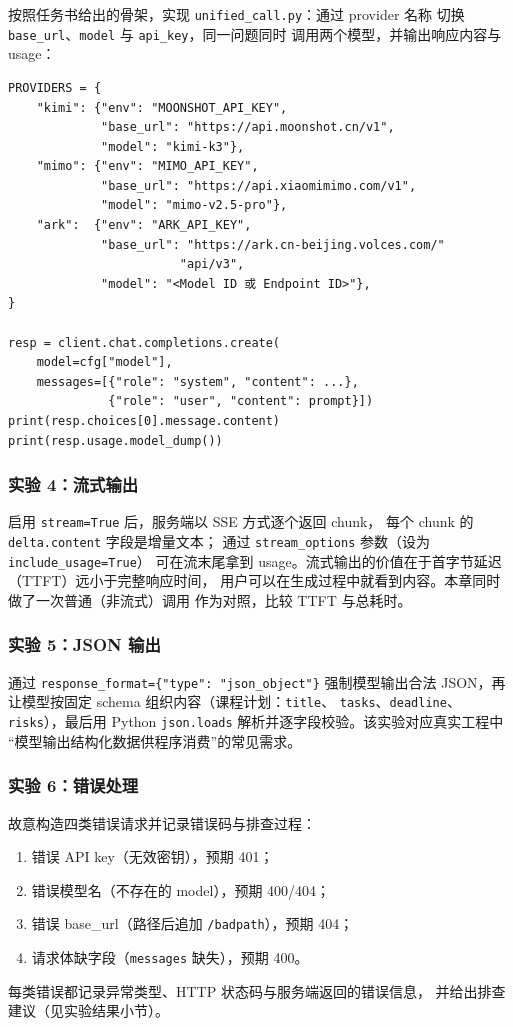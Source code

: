 按照任务书给出的骨架，实现 \texttt{unified\_call.py}：通过 provider 名称
切换 \texttt{base\_url}、\texttt{model} 与 \texttt{api\_key}，同一问题同时
调用两个模型，并输出响应内容与 usage：

\begin{verbatim}
PROVIDERS = {
    "kimi": {"env": "MOONSHOT_API_KEY",
             "base_url": "https://api.moonshot.cn/v1",
             "model": "kimi-k3"},
    "mimo": {"env": "MIMO_API_KEY",
             "base_url": "https://api.xiaomimimo.com/v1",
             "model": "mimo-v2.5-pro"},
    "ark":  {"env": "ARK_API_KEY",
             "base_url": "https://ark.cn-beijing.volces.com/"
                        "api/v3",
             "model": "<Model ID 或 Endpoint ID>"},
}

resp = client.chat.completions.create(
    model=cfg["model"],
    messages=[{"role": "system", "content": ...},
              {"role": "user", "content": prompt}])
print(resp.choices[0].message.content)
print(resp.usage.model_dump())
\end{verbatim}

\subsubsection{实验 4：流式输出}

启用 \texttt{stream=True} 后，服务端以 SSE 方式逐个返回 chunk，
每个 chunk 的 \texttt{delta.content} 字段是增量文本；
通过 \texttt{stream\_options} 参数（设为 \texttt{include\_usage=True}）
可在流末尾拿到 usage。流式输出的价值在于首字节延迟（TTFT）远小于完整响应时间，
用户可以在生成过程中就看到内容。本章同时做了一次普通（非流式）调用
作为对照，比较 TTFT 与总耗时。

\subsubsection{实验 5：JSON 输出}

通过 \texttt{response\_format=\{"type": "json\_object"\}} 强制模型输出合法
JSON，再让模型按固定 schema 组织内容（课程计划：\texttt{title}、
\texttt{tasks}、\texttt{deadline}、\texttt{risks}），最后用 Python
\texttt{json.loads} 解析并逐字段校验。该实验对应真实工程中
``模型输出结构化数据供程序消费''的常见需求。

\subsubsection{实验 6：错误处理}

故意构造四类错误请求并记录错误码与排查过程：
\begin{enumerate}[leftmargin=4em,itemsep=0pt,topsep=2pt]
    \item 错误 API key（无效密钥），预期 401；
    \item 错误模型名（不存在的 model），预期 400/404；
    \item 错误 base\_url（路径后追加 \texttt{/badpath}），预期 404；
    \item 请求体缺字段（\texttt{messages} 缺失），预期 400。
\end{enumerate}
每类错误都记录异常类型、HTTP 状态码与服务端返回的错误信息，
并给出排查建议（见实验结果小节）。

